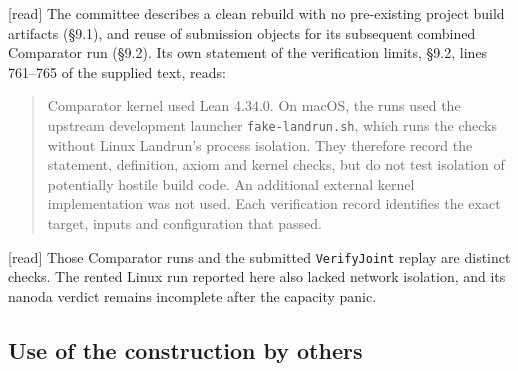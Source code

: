 \documentclass[11pt,a4paper]{article}
\theoremstyle{plain}
\theoremstyle{definition}
\theoremstyle{remark}
\numberwithin{equation}{section}
\newcommand{\st}[1]{\textsf{[#1]}}
\begin{document}
\st{read} The committee describes a clean rebuild with no pre-existing project build artifacts (\S9.1),
and reuse of submission objects for its subsequent combined Comparator run (\S9.2).
Its own statement of the verification limits, \S9.2, lines 761--765 of the supplied text, reads:
\begin{quote}\small
Comparator kernel used Lean 4.34.0. On macOS, the runs used the upstream development launcher
\texttt{fake-landrun.sh}, which runs the checks without Linux Landrun's process isolation. They therefore
record the statement, definition, axiom and kernel checks, but do not test isolation of potentially
hostile build code. An additional external kernel implementation was not used. Each verification
record identifies the exact target, inputs and configuration that passed.
\end{quote}
\st{read} Those Comparator runs and the submitted \texttt{VerifyJoint} replay are distinct checks.
The rented Linux run reported here also lacked network isolation, and its nanoda verdict remains incomplete after the capacity panic.

\subsection*{Use of the construction by others}\label{sec:others}
\end{document}
